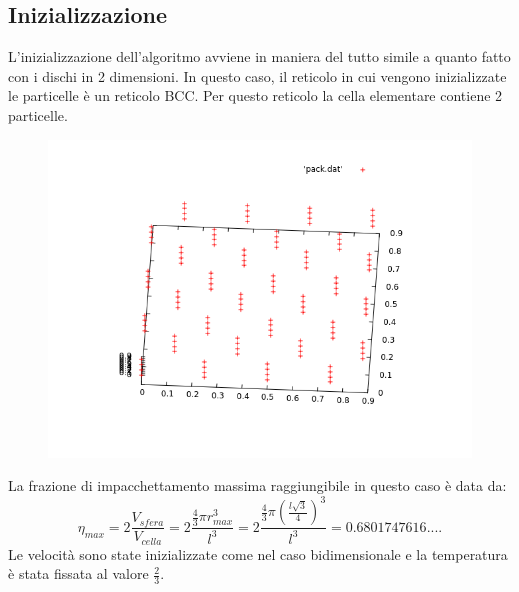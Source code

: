 \subsection{Inizializzazione}
L'inizializzazione dell'algoritmo avviene in maniera del tutto simile a quanto fatto con i dischi in 2 dimensioni.
In questo caso, il reticolo in cui vengono inizializzate le particelle è un reticolo BCC. Per questo reticolo la cella elementare contiene 2 particelle.\\
\begin{center}
	\begin{figure}[h]
	\centering
		\includegraphics[scale=0.6]{sfere3D/reticolo.png}
	\end{figure}
\end{center}
La frazione di impacchettamento massima raggiungibile in questo caso è data da:
$$
	\eta_{max} = 2 \frac{V_{sfera}}{V_{cella}} = 2 \frac{ \frac{4}{3} \pi r_{max}^3}{ l^3 } = 2 \frac{\frac{4}{3} \pi
	( \frac{l \sqrt{3}}{4} )^3}{l^3 }= 0.6801747616....
$$
Le velocità sono state inizializzate come nel caso bidimensionale e la temperatura è stata fissata al valore $\frac{2}{3}$.


